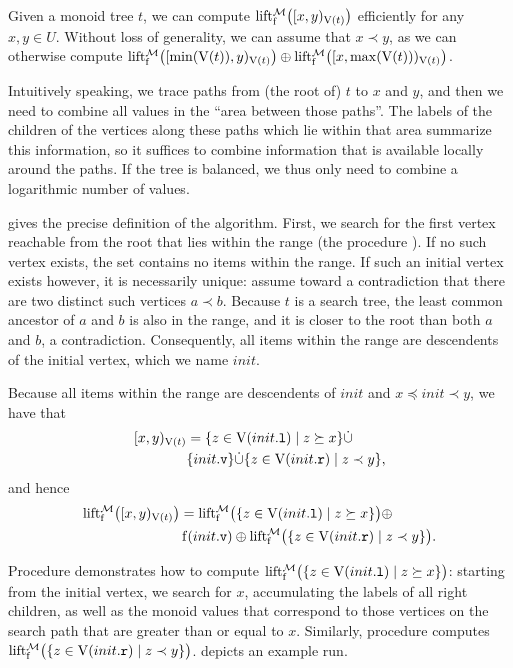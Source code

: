 \documentclass[conference]{IEEEtran}
\begin{document}
Given a monoid tree $t$, we can compute $\operatorname{lift_{\operatorname{f}}^{\mathcal{M}}}\bigl([{x},{y})_{\operatorname{V}(t)}\bigr)$ efficiently for any $x, y \in U$. Without loss of generality, we can assume that $x \prec y$, as we can otherwise compute $\operatorname{lift_{\operatorname{f}}^{\mathcal{M}}}\bigl([{\min(\operatorname{V}(t))},{y})_{\operatorname{V}(t)}\bigr) \oplus \operatorname{lift_{\operatorname{f}}^{\mathcal{M}}}\bigl([{x},{\max(\operatorname{V}(t))})_{\operatorname{V}(t)}\bigr)$.

Intuitively speaking, we trace paths from (the root of) $t$ to $x$ and $y$, and then we need to combine all values in the ``area between those paths''. The labels of the children of the vertices along these paths which lie within that area summarize this information, so it suffices to combine information that is available locally around the paths. If the tree is balanced, we thus only need to combine a logarithmic number of values.

 gives the precise definition of the algorithm. First, we search for the first vertex reachable from the root that lies within the range (the procedure ). If no such vertex exists, the set contains no items within the range. If such an initial vertex exists however, it is necessarily unique: assume toward a contradiction that there are two distinct such vertices $a \prec b$. Because $t$ is a search tree, the least common ancestor of $a$ and $b$ is also in the range, and it is closer to the root than both $a$ and $b$, a contradiction. Consequently, all items within the range are descendents of the initial vertex, which we name $init$.

Because all items within the range are descendents of $init$ and $x \preceq init \prec y$, we have that \begin{align*}
	[{x},{y})_{\operatorname{V}(t)} &= \{z \in \operatorname{V}({init}\mathtt{.l}) \mid z \succeq x\} \dot{\cup}\\
	&\{{init}\mathtt{.v}\} \dot{\cup} \{z \in \operatorname{V}({init}\mathtt{.r}) \mid z \prec y\},
\end{align*} and hence \begin{align*}
	\operatorname{lift_{\operatorname{f}}^{\mathcal{M}}}\bigl([{x},{y})_{\operatorname{V}(t)}\bigr) &= \operatorname{lift_{\operatorname{f}}^{\mathcal{M}}}\bigl(\{z \in \operatorname{V}({init}\mathtt{.l}) \mid z \succeq x\}\bigr) \oplus\\
	&\operatorname{f}({init}\mathtt{.v}) \oplus \operatorname{lift_{\operatorname{f}}^{\mathcal{M}}}\bigl(\{z \in \operatorname{V}({init}\mathtt{.r}) \mid z \prec y\}\bigr).
\end{align*}

Procedure  demonstrates how to compute $\operatorname{lift_{\operatorname{f}}^{\mathcal{M}}}\bigl(\{z \in \operatorname{V}({init}\mathtt{.l}) \mid z \succeq x\}\bigr)$: starting from the initial vertex, we search for $x$, accumulating the labels of all right children, as well as the monoid values that correspond to those vertices on the search path that are greater than or equal to $x$. Similarly, procedure  computes $\operatorname{lift_{\operatorname{f}}^{\mathcal{M}}}\bigl(\{z \in \operatorname{V}({init}\mathtt{.r}) \mid z \prec y\}\bigr)$.  depicts an example run.
\end{document}
